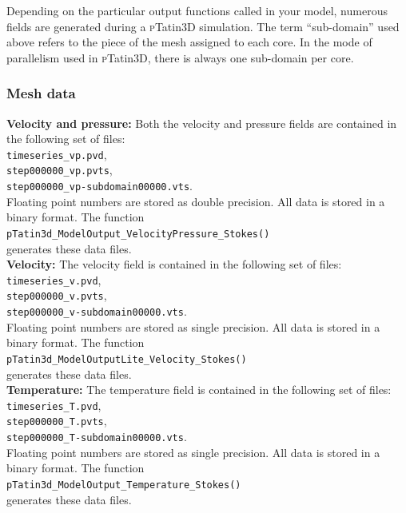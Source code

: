 \documentclass[paper=a4, fontsize=11pt,twoside]{scrartcl}
\newcommand{\ptat}{{{\textsc pTatin3D}}}
\newcommand{\unix}[1]{\texttt{\footnotesize #1}}
\begin{document}
{{Depending on the particular output functions called in your model, numerous fields are generated during a {\ptat} simulation.
The term ``sub-domain'' used above refers to the piece of the mesh assigned to each core. In the mode of parallelism used in {\ptat}, there is always one sub-domain per core.

\subsubsection{Mesh data}
{\bf Velocity and pressure:} Both the velocity and pressure fields are contained in the following set of files: \\
\unix{timeseries\_vp.pvd}, \\
\unix{step000000\_vp.pvts}, \\
\unix{step000000\_vp-subdomain00000.vts}.\\
Floating point numbers are stored as double precision. All data is stored in a binary format. The function \\
\unix{pTatin3d\_ModelOutput\_VelocityPressure\_Stokes()} \\
generates these data files.
\\[8pt]
{\bf Velocity:} The velocity field is contained in the following set of files: \\
\unix{timeseries\_v.pvd}, \\
\unix{step000000\_v.pvts}, \\
\unix{step000000\_v-subdomain00000.vts}. \\
Floating point numbers are stored as single precision. All data is stored in a binary format.
The function \\
\unix{pTatin3d\_ModelOutputLite\_Velocity\_Stokes()} \\
generates these data files.
\\[8pt]
{\bf Temperature:} The temperature field is contained in the following set of files: \\
\unix{timeseries\_T.pvd}, \\
\unix{step000000\_T.pvts}, \\
\unix{step000000\_T-subdomain00000.vts}.\\
Floating point numbers are stored as single precision. All data is stored in a binary format.
The function \\
\unix{pTatin3d\_ModelOutput\_Temperature\_Stokes()} \\
generates these data files.


}}
\end{document}
